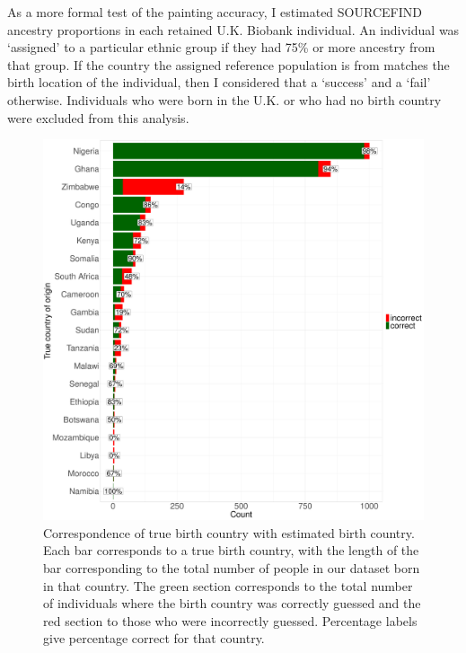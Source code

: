 As a more formal test of the painting accuracy, I estimated SOURCEFIND ancestry proportions in each retained U.K. Biobank individual. An individual was `assigned' to a particular ethnic group if they had 75\% or more ancestry from that group. If the country the assigned reference population is from matches the birth location of the individual, then I considered that a `success' and a `fail' otherwise. Individuals who were born in the U.K. or who had no birth country were excluded from this analysis. 

\begin{figure}[htp]
    \centering
    \includegraphics[width=1.0\textwidth]{../images/chapter3/country_of_origin_allInds.pdf}
    \caption{Correspondence of true birth country with estimated birth country. Each bar corresponds to a true birth country, with the length of the bar corresponding to the total number of people in our dataset born in that country. The green section corresponds to the total number of individuals where the birth country was correctly guessed and the red section to those who were incorrectly guessed. Percentage labels give percentage correct for that country.}
    \label{fig:country_of_origin_allInds}
\end{figure}

